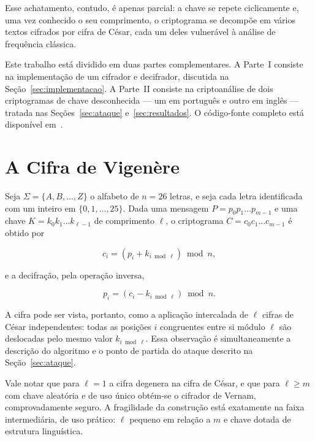 \documentclass[conference]{IEEEtran}
\begin{document}
Esse achatamento, contudo, é apenas parcial: a chave se repete ciclicamente e,
uma vez conhecido o seu comprimento, o criptograma se decompõe em vários
textos cifrados por cifra de César, cada um deles vulnerável à análise de
frequência clássica.

Este trabalho está dividido em duas partes complementares. A Parte~I consiste
na implementação de um cifrador e decifrador, discutida na
Seção~\ref{sec:implementacao}. A Parte~II consiste na criptoanálise de dois
criptogramas de chave desconhecida --- um em português e outro em inglês ---
tratada nas Seções~\ref{sec:ataque} e~\ref{sec:resultados}. O código-fonte
completo está disponível em~\cite{repo}.

\section{A Cifra de Vigenère}
\label{sec:cifra}
Seja $\Sigma = \{A, B, \dots, Z\}$ o alfabeto de $n = 26$ letras, e seja cada
letra identificada com um inteiro em $\{0, 1, \dots, 25\}$. Dada uma mensagem
$P = p_0 p_1 \dots p_{m-1}$ e uma chave $K = k_0 k_1 \dots k_{\ell-1}$ de
comprimento $\ell$, o criptograma $C = c_0 c_1 \dots c_{m-1}$ é obtido por

\begin{equation}
c_i = (p_i + k_{i \bmod \ell}) \bmod n,
\label{eq:cifracao}
\end{equation}

e a decifração, pela operação inversa,

\begin{equation}
p_i = (c_i - k_{i \bmod \ell}) \bmod n.
\label{eq:decifracao}
\end{equation}

A cifra pode ser vista, portanto, como a aplicação intercalada de $\ell$
cifras de César independentes: todas as posições $i$ congruentes entre si
módulo $\ell$ são deslocadas pelo mesmo valor $k_{i \bmod \ell}$. Essa
observação é simultaneamente a descrição do algoritmo e o ponto de partida do
ataque descrito na Seção~\ref{sec:ataque}.

Vale notar que para $\ell = 1$ a cifra degenera na cifra de César, e que para
$\ell \geq m$ com chave aleatória e de uso único obtém-se o cifrador de
Vernam, comprovadamente seguro. A fragilidade da construção está exatamente
na faixa intermediária, de uso prático: $\ell$ pequeno em relação a $m$ e
chave dotada de estrutura linguística.
\end{document}
